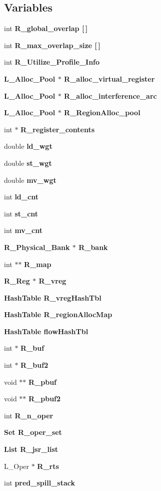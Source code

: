 \subsection*{Variables}
\begin{CompactItemize}
\item 
int \bf{R\_\-global\_\-overlap} [$\,$]
\item 
int \bf{R\_\-max\_\-overlap\_\-size} [$\,$]
\item 
int \bf{R\_\-Utilize\_\-Profile\_\-Info}
\item 
\bf{L\_\-Alloc\_\-Pool} $\ast$ \bf{R\_\-alloc\_\-virtual\_\-register}
\item 
\bf{L\_\-Alloc\_\-Pool} $\ast$ \bf{R\_\-alloc\_\-interference\_\-arc}
\item 
\bf{L\_\-Alloc\_\-Pool} $\ast$ \bf{R\_\-Region\-Alloc\_\-pool}
\item 
int $\ast$ \bf{R\_\-register\_\-contents}
\item 
double \bf{ld\_\-wgt}
\item 
double \bf{st\_\-wgt}
\item 
double \bf{mv\_\-wgt}
\item 
int \bf{ld\_\-cnt}
\item 
int \bf{st\_\-cnt}
\item 
int \bf{mv\_\-cnt}
\item 
\bf{R\_\-Physical\_\-Bank} $\ast$ \bf{R\_\-bank}
\item 
int $\ast$$\ast$ \bf{R\_\-map}
\item 
\bf{R\_\-Reg} $\ast$ \bf{R\_\-vreg}
\item 
\bf{Hash\-Table} \bf{R\_\-vreg\-Hash\-Tbl}
\item 
\bf{Hash\-Table} \bf{R\_\-region\-Alloc\-Map}
\item 
\bf{Hash\-Table} \bf{flow\-Hash\-Tbl}
\item 
int $\ast$ \bf{R\_\-buf}
\item 
int $\ast$ \bf{R\_\-buf2}
\item 
void $\ast$$\ast$ \bf{R\_\-pbuf}
\item 
void $\ast$$\ast$ \bf{R\_\-pbuf2}
\item 
int \bf{R\_\-n\_\-oper}
\item 
\bf{Set} \bf{R\_\-oper\_\-set}
\item 
\bf{List} \bf{R\_\-jsr\_\-list}
\item 
L\_\-Oper $\ast$ \bf{R\_\-rts}
\item 
int \bf{pred\_\-spill\_\-stack}
\item 
$$
\end{CompactItemize}
